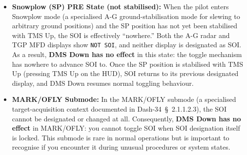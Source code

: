 \documentclass[11pt,a4paper]{article}
\providecommand{\dashref}[1]{Dash-34~\S~#1}
\begin{document}
\begin{itemize}
  \item \textbf{Snowplow (SP) PRE State (not stabilised):} When the pilot enters Snowplow mode (a specialised A-G ground-stabilisation mode for slewing to arbitrary ground positions) and the SP position has not yet been stabilised with TMS Up, the SOI is effectively ``nowhere.'' Both the A-G radar and TGP MFD displays show \texttt{NOT SOI}, and neither display is designated as SOI. As a result, \textbf{DMS Down has no effect} in this state: the toggle mechanism has nowhere to advance SOI to. Once the SP position is stabilised with TMS Up (pressing TMS Up on the HUD), SOI returns to its previous designated display, and DMS Down resumes normal toggling behaviour.

  \item \textbf{MARK/OFLY Submode:} In the MARK/OFLY submode (a specialised target-acquisition context documented in \dashref{2.1.1.2.3}), the SOI cannot be designated or changed at all. Consequently, \textbf{DMS Down has no effect} in MARK/OFLY: you cannot toggle SOI when SOI designation itself is locked. This submode is rare in normal operations but is important to recognise if you encounter it during unusual procedures or system states.
\end{itemize}
\end{document}
